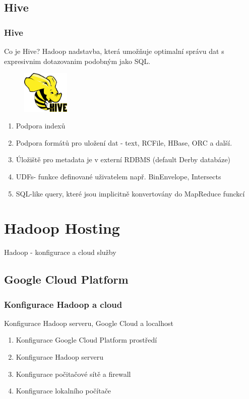\documentclass[unicode,bookmarksnumbered]{beamer}
\begin{document}
	\subsection{Hive}
	\begin{frame}
		\frametitle{Hive}
		Co je Hive? Hadoop nadstavba, která umožňuje optimalní správu dat s
expresivnim dotazovanim podobným jako SQL.
				\begin{figure}
					\centering
					\includegraphics[width=0.2\textwidth]{./img/spatial/hive.png}
				\end{figure}
		\begin{enumerate}
			\item Podpora indexů
			\item Podpora formátů pro uložení dat - text, RCFile, HBase, ORC a další.
			\item Úložiště pro metadata je v externí RDBMS (default Derby databáze)
			\item UDFs- funkce definované uživatelem např. BinEnvelope, Intersects
			\item SQL-like query, které jsou implicitně konvertovány do MapReduce funckcí
		\end{enumerate}
	\end{frame}

	
	\section{Hadoop Hosting}
	\begin{frame}[c]
		\begin{center}	
		\Huge Hadoop - konfigurace a cloud služby
		\end{center}
	\end{frame}
	
	
	\subsection{Google Cloud Platform}
	\begin{frame}
		\frametitle{Konfigurace Hadoop a cloud}
		Konfigurace Hadoop serveru, Google Cloud a localhost
		\begin{enumerate}
		\item Konfigurace Google Cloud Platform prostředí
		\item Konfigurace Hadoop serveru
		\item Konfigurace počitačové sítě a firewall
		\item Konfigurace lokalního počítače
		\end{enumerate}
	\end{frame}
	
\end{document}
